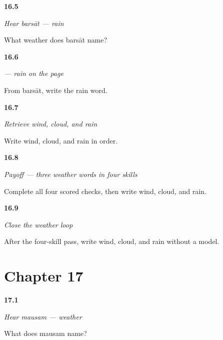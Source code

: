 \noindent\begin{minipage}[t]{\linewidth}
\raggedright
\hypertarget{review-MW-C11-hear-barsaat-meaning}{\textbf{16.5}} \emph{Hear \emph{barsāt} — rain}\par
\small What weather does barsāt name?
\end{minipage}\par\medskip

\noindent\begin{minipage}[t]{\linewidth}
\raggedright
\hypertarget{review-MW-C11-barsaat-dictation}{\textbf{16.6}} \emph{ — rain on the page}\par
\small From barsāt, write the rain word.
\end{minipage}\par\medskip

\noindent\begin{minipage}[t]{\linewidth}
\raggedright
\hypertarget{review-MW-R11-weather-three-recall}{\textbf{16.7}} \emph{Retrieve wind, cloud, and rain}\par
\small Write wind, cloud, and rain in order.
\end{minipage}\par\medskip

\noindent\begin{minipage}[t]{\linewidth}
\raggedright
\hypertarget{review-MW-C11-weather-three-payoff}{\textbf{16.8}} \emph{Payoff — three weather words in four skills}\par
\small Complete all four scored checks, then write wind, cloud, and rain.
\end{minipage}\par\medskip

\noindent\begin{minipage}[t]{\linewidth}
\raggedright
\hypertarget{review-MW-R11-weather-close-recall}{\textbf{16.9}} \emph{Close the weather loop}\par
\small After the four-skill pass, write wind, cloud, and rain without a model.
\end{minipage}\par\medskip

\section*{Chapter 17}

\noindent\begin{minipage}[t]{\linewidth}
\raggedright
\hypertarget{review-MW-C12-hear-mausam-meaning}{\textbf{17.1}} \emph{Hear \emph{mausam} — weather}\par
\small What does mausam name?
\end{minipage}\par\medskip

